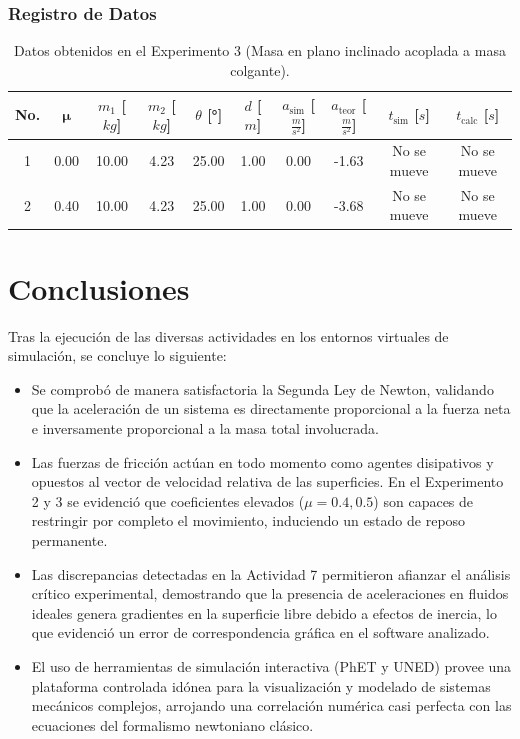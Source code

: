 \documentclass[11pt,a4paper]{article}
\begin{document}
\subsubsection{Registro de Datos}
\begin{table}[H]
\centering
\caption{Datos obtenidos en el Experimento 3 (Masa en plano inclinado acoplada a masa colgante).}
\begin{tabularx}{\textwidth}{@{} c C C C C C C C C C @{}}
\toprule
\textbf{No.} & $\boldsymbol{\mu}$ & \textbf{$m_1$ [$kg$]} & \textbf{$m_2$ [$kg$]} & \textbf{$\theta$ [\si{\degree}]} & \textbf{$d$ [$m$]} & \textbf{$a_{\text{sim}}$ [$\frac{m}{s^2}$]} & \textbf{$a_{\text{teor}}$ [$\frac{m}{s^2}$]} & \textbf{$t_{\text{sim}}$ [$s$]} & \textbf{$t_{\text{calc}}$ [$s$]} \\  & 0.00 & 10.00 & 4.23 & 25.00 & 1.00 & 0.00 & -1.63 & No se mueve & No se mueve \\
2 & 0.40 & 10.00 & 4.23 & 25.00 & 1.00 & 0.00 & -3.68 & No se mueve & No se mueve \\
\bottomrule
\end{tabularx}
\end{table}

\section{Conclusiones}
Tras la ejecución de las diversas actividades en los entornos virtuales de simulación, se concluye lo siguiente:
\begin{itemize}
    \item Se comprobó de manera satisfactoria la Segunda Ley de Newton, validando que la aceleración de un sistema es directamente proporcional a la fuerza neta e inversamente proporcional a la masa total involucrada.
    \item Las fuerzas de fricción actúan en todo momento como agentes disipativos y opuestos al vector de velocidad relativa de las superficies. En el Experimento 2 y 3 se evidenció que coeficientes elevados ($\mu = 0.4, 0.5$) son capaces de restringir por completo el movimiento, induciendo un estado de reposo permanente.
    \item Las discrepancias detectadas en la Actividad 7 permitieron afianzar el análisis crítico experimental, demostrando que la presencia de aceleraciones en fluidos ideales genera gradientes en la superficie libre debido a efectos de inercia, lo que evidenció un error de correspondencia gráfica en el software analizado.
    \item El uso de herramientas de simulación interactiva (PhET y UNED) provee una plataforma controlada idónea para la visualización y modelado de sistemas mecánicos complejos, arrojando una correlación numérica casi perfecta con las ecuaciones del formalismo newtoniano clásico.
\end{itemize}
\end{document}
